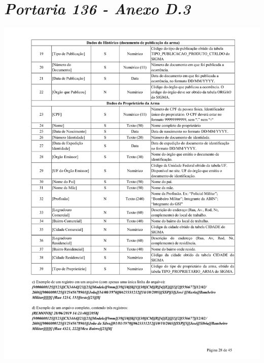 \chapter{\textit{Portaria 136 - Anexo D.3}}
\label{sec:anexoA3}
\includegraphics[scale=0.8]{imagens/AnexoA3-AnexoD-portaria-136}

